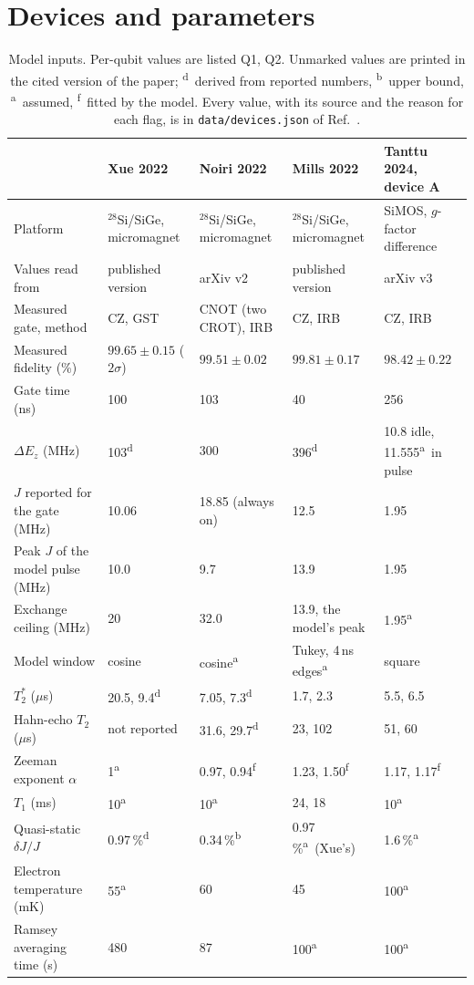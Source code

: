 \documentclass[reprint,aps,pra,floatfix,superscriptaddress,longbibliography,nofootinbib]{revtex4-2}
\newcommand{\dEz}{\Delta E_z}
\newcommand{\Ts}{T_2^{*}}
\newcommand{\fa}{\textsuperscript{a}}
\newcommand{\fd}{\textsuperscript{d}}
\newcommand{\fb}{\textsuperscript{b}}
\newcommand{\ff}{\textsuperscript{f}}
\begin{document}
\section{Devices and parameters}
\label{sec:devices}

\begin{table}
\caption{Model inputs. Per-qubit values are listed Q1, Q2. Unmarked values are printed in the cited version of the paper; \fd\ derived from reported numbers, \fb\ upper bound, \fa\ assumed, \ff\ fitted by the model. Every value, with its source and the reason for each flag, is in \texttt{data/devices.json} of Ref.~.}
\label{tab:params}
\small
\begin{ruledtabular}
\begin{tabular}{lllll}
 & Xue 2022~\cite{xue2022} & Noiri 2022~\cite{noiri2022} & Mills 2022~\cite{mills2022} & Tanttu 2024, device A~\cite{tanttu2024} \\
\midrule
Platform & $^{28}$Si/SiGe, micromagnet & $^{28}$Si/SiGe, micromagnet & $^{28}$Si/SiGe, micromagnet & SiMOS, $g$-factor difference \\
Values read from & published version & arXiv v2 & published version & arXiv v3 \\
Measured gate, method & CZ, GST & CNOT (two CROT), IRB & CZ, IRB & CZ, IRB \\
Measured fidelity (\%) & $99.65\pm0.15$ ($2\sigma$) & $99.51\pm0.02$ & $99.81\pm0.17$ & $98.42\pm0.22$ \\
Gate time (ns) & 100 & 103 & 40 & 256 \\
$\dEz$ (MHz) & 103\fd & 300 & 396\fd & 10.8 idle, 11.555\fa\ in pulse \\
$J$ reported for the gate (MHz) & 10.06 & 18.85 (always on) & 12.5 & 1.95 \\
Peak $J$ of the model pulse (MHz) & 10.0 & 9.7 & 13.9 & 1.95 \\
Exchange ceiling (MHz) & 20 & 32.0 & 13.9, the model's peak & 1.95\fa \\
Model window & cosine & cosine\fa & Tukey, 4\,ns edges\fa & square \\
$\Ts$ ($\mu$s) & 20.5, 9.4\fd & 7.05, 7.3\fd & 1.7, 2.3 & 5.5, 6.5 \\
Hahn-echo $T_2$ ($\mu$s) & not reported & 31.6, 29.7\fd & 23, 102 & 51, 60 \\
Zeeman exponent $\alpha$ & 1\fa & 0.97, 0.94\ff & 1.23, 1.50\ff & 1.17, 1.17\ff \\
$T_1$ (ms) & 10\fa & 10\fa & 24, 18 & 10\fa \\
Quasi-static $\delta J/J$ & 0.97\,\%\fd & 0.34\,\%\fb & 0.97\,\%\fa\ (Xue's) & 1.6\,\%\fa \\
Electron temperature (mK) & 55\fa & 60 & 45 & 100\fa \\
Ramsey averaging time (s) & 480 & 87 & 100\fa & 100\fa \\
\end{tabular}
\end{ruledtabular}
\end{table}
\end{document}
